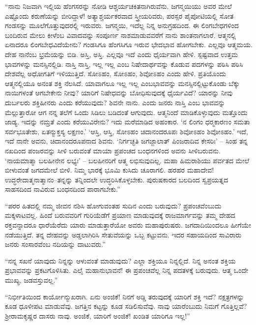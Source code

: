  “ನಾನು ನಿಜವಾಗಿ ಇಲ್ಲಿಯ ಹೆಂಗಸರನ್ನು ನೋಡಿ ಆಶ್ಚರ್ಯಚಕಿತನಾಗಿರುವೆನು. ಜಗನ್ಮಯಿಯು ಅವರ ಮೇಲೆ ಎಷ್ಟೊಂದು ಕರುಣೆಯನ್ನು ಬೀರಿದ್ದಾಳೆ! ಅತ್ಯಾಶ್ಚರ್ಯಕರವಾದ ಸ್ತ್ರೀಯರಿವರು, ಪರಸ್ಪರ ಪೈಪೋಟಿಯಲ್ಲಿ ಸೋತ ಗಂಡಸನ್ನು ಮೂಲೆಗೊತ್ತುವುದರಲ್ಲಿ ಇರುವರು. ಜಗನ್ಮಯಿ, ಇದೆಲ್ಲ ನಿನ್ನ ಅನುಗ್ರಹದಿಂದ. ಈ ಲಿಂಗಬೇಧಗಳಿಂದ ಬಂದಿರುವ ಮೇಲು ಕೀಳೆಂಬ ವಿವಾದವನ್ನು ಸಂಪೂರ್ಣ ನಾಶಮಾಡುವವರೆಗೆ ನಾನು ಶಾಂತನಾಗಲಾರೆ. ಆತ್ಮನಲ್ಲಿ ಏನಾದರೂ‌ ಲಿಂಗಬೇಧವಿದೆಯೇನು? ಗಂಡಸಿಗೂ ಹೆಂಗಸಿಗೂ ಇರುವ ಭೇದಭಾವ ಹೋಗಬೇಕು. ಎಲ್ಲವೂ ಆತ್ಮಮಯ. ದೇಹ ನಾನೆಂಬ ಭ್ರಮೆಯನ್ನು ಬಿಡಿ. ಅಸ್ತಿ, ಅಸ್ತಿ. ಎಲ್ಲವೂ ಇದೆ ಎಂದು ಧೈರ್ಯವಾಗಿ ಹೇಳಿ. ಸ್ಪಷ್ಟವಾದ ಉತ್ತಮ ಭಾವಗಳನ್ನು ಮನಸ್ಸಿನಲ್ಲಿಡಿ. ನಾಸ್ತಿ ನಾಸ್ತಿ, ಇಲ್ಲ ಇಲ್ಲ ಎಂಬ ನಿಷೇದಾರ್ಥವನ್ನು ಕೊಡುವ ಪದಗಳನ್ನು ಪಠಿಸಿ ಪಠಿಸಿ ದೇಶವೆಲ್ಲ ಅಧೋ\-ಗತಿಗೆ ಇಳಿಯುತ್ತಿದೆ. ಸೋಽಹಂ, ಸೋಽಹಂ, ಶಿವೋಽಹಂ ಎಂದು ಹೇಳಿ. ಪ್ರತಿಯೊಂದು ಆತ್ಮನಲ್ಲಿಯೂ ಅನಂತ ಶಕ್ತಿ ನೆಲಸಿದೆ. ಯಾವಾಗಲೂ ಇಲ್ಲ ಇಲ್ಲ ಎಂಬ\break ಭಾವವನ್ನು ಮನಸ್ಸಿನಲ್ಲಿಟ್ಟುಕೊಂಡು ಬೆಕ್ಕು ನಾಯಿಗಳಂತೆ ಆಗಬೇಕೇನು ನೀವು? ಯಾರಿಗೆ ನಿಷೇಧವನ್ನು ಬೋಧಿಸುವುದಕ್ಕೆ ಧೈರ್ಯವಿದೆ? ಯಾರನ್ನು ನೀವು ದುರ್ಬಲರು ಶಕ್ತಿಹೀನರು ಎಂದು ಕರೆಯುವುದು? ಶಿವನೇ ನಾನು. ಎಂದು ಜನರು ನಾಸ್ತಿ ಎಂಬ ಭಾವವನ್ನು ಮೆಲ್ಲುತ್ತಾರೋ ಆಗ ನನ್ನ ತಲೆಗೆ ಒಂದು ಸಿಡಿಲು ಬಡಿದಂತೆ ಆಗುವುದು. ಆತ್ಮನಿಂದೆ ಮಾಡಿಕೊಳ್ಳುವುದು ಮತ್ತೊಂದು ಜಾಡ್ಯ. ಇದನ್ನು ನಮ್ರತೆ ಎಂದು ಕರೆಯುವಿರೇನು? ಇದು ಮರೆಮಾಡಿದ ಅಹಂಕಾರ. ‘ನ ಲಿಂಗಂ ಧರ‍್ಮಕಾರಣಂ ಸಮತಾ ಸರ್ವಭೂತೇಶು, ಏತನ್ಮುಕ್ತಸ್ಯ ಲಕ್ಷಣಂ.’ ‘ಆಸ್ತಿ, ಆಸ್ತಿ, ಸೋಽಹಂ ಚಿದಾನಂದರೂಪಃ ಶಿವೋಽಹಂ ಶಿವೋಽಹಂ.’ ಇದೆ, ಇದೆ ನಾನೇ ಅವನು, ಚಿದಾನಂದರೂಪನಾದ ಶಿವನು. ‘ನಿರ್ಗಚ್ಛತಿ ಜಗಜ್ಜಾಲಾತ್ ಪಿಂಜರಾದಿವ ಕೇಸರಿಃ' – ಸಿಂಹ ತನ್ನ ನಖದಿಂದ ಪಂಜರವನ್ನು ಸೀಳಿ ಬರುವಂತೆ ಮಾಯಾ ಪ್ರಪಂಚದ ಬಂಧನಗಳಿಂದ ಅವನು ಸೀಳಿಬರುವನು. ‘ನಾಯಮಾತ್ಮಾ ಬಲಹೀನೇನ ಲಭ್ಯಃ’ – ಬಲಹೀನರಿಗೆ ಆತ್ಮ ಲಭಿಸುವುದಿಲ್ಲ. ಮಹಾ ಹಿಮರಾಶಿಯು ಪರ್ವತದ ಮೇಲೆ ಬೀಳುವಂತೆ ಜಗದಮೇಲೆ ಬೀಳಿ. ನಿಮ್ಮ ಭಾರಕ್ಕೆ ಭೂಮಿ ಕುಸಿದು ಚೂರಾಗಲಿ. ಹರಹರ ಮಹಾದೇವ! ಉದ್ಧರೇದಾತ್ಮನಾತ್ಮಾನಂ–ತನ್ನನ್ನು ತನ್ನಿಂದಲೇ ಉದ್ಧರಿಸಿಕೊಳ್ಳಬೇಕು. ಪುರುಷಕಾರದ ಬಲದಿಂದ ಸ್ವಪ್ರಯತ್ನದ ಸಾಹಸದಿಂದ ನಾವಿರುವ ಬಂಧನದಿಂದ ಪಾರಾಗಬೇಕು.” 

 “ಪರರ ಹಿತದಲ್ಲಿ ನಮ್ಮ ಜೀವನ ನಶಿಸಿ ಹೋಗುವಂತಹ ಸುದಿನ ಎಂದು ಬರುವುದು? ಪ್ರಪಂಚವೆಂಬುದು ಮಕ್ಕಳಾಟವಲ್ಲ. ಹಿಂದೆ ಬರುವವರಿಗೆ ಗುರಿಯೆಡೆಗೆ ಪ್ರಯಾಣ ಮಾಡುವುದಕ್ಕೆ ರಾಜಮಾರ್ಗವನ್ನು ತಮ್ಮ ದೇಹದ ರಕ್ತವನ್ನಾದರೂ ಧಾರೆಯೆರೆದು ಯಾರು ಮಾಡುತ್ತಾರೆಯೋ ಅವರು ಮಹಾಪುರುಷರು. ಜಗದಾದಿಯಿಂದಲೂ ಹೀಗೆಯೇ ನಡೆಯುತ್ತಿದೆ. ತನ್ನ ದೇಹವನ್ನು ಅಡ್ಡಲಾಗಿರಿಸಿ ಸೇತುವೆಯನ್ನು ಒಬ್ಬ ಕಟ್ಟುವನು. ಇದರ ಸಹಾಯದಿಂದ ಸಾವಿರಾರು ಜನರು ಸಂಸಾರವೆಂಬ ನದಿಯನ್ನು ದಾಟುವರು.” 

 “ನನ್ನ ಸಖನೆ ಯಾವುದು ನಿನ್ನನ್ನು ಆಳುವಂತೆ ಮಾಡುವುದು? ಎಲ್ಲಾ ಶಕ್ತಿಯೂ ನಿನ್ನಲ್ಲಿದೆ. ನಿನ್ನ ಅನಂತ ಶಕ್ತಿಯ ಪ್ರಭಾವವನ್ನು ಪ್ರಕಟಗೊಳಿಸಿತು. ಎಲೈ ಮಹಾನುಭಾವನೆ! ಈ ಪ್ರಪಂಚವೆಲ್ಲ ನಿನ್ನ ಪದತಳಕ್ಕೆ ಬರುವುದು. ಆತ್ಮ ಒಂದೇ ಮುಖ್ಯ, ಜಡವಸ್ತುವಲ್ಲ.” 

 “ನಿರ್ಭೀತಿಯಿಂದ ಕಾರ್ಯೋನ್ಮುಖರಾಗಿ. ಏನು ಅಂಜಿಕೆ! ನಿನಗೆ ಅಡ್ಡಿ ತರುವುದಕ್ಕೆ ಯಾರಿಗೆ ಶಕ್ತಿ ಇದೆ? ನಕ್ಷತ್ರಗಳನ್ನು ಕೂಡ ಧೂಳೀಪಟ ಮಾಡುವೆವು. ಜಗತ್ತಿನ ಕಟ್ಟನ್ನು ಕೂಡ ಸಡಿಲಿಸುವೆವು. ನಾವು ಯಾರೆಂಬುದು ನಿಮಗೆ ಗೊತ್ತಿಲ್ಲವೆ? ಶ‍್ರೀರಾಮಕೃಷ್ಣರ ದಾಸರು ನಾವು. ಅಂಜಿಕೆ, ಯಾರಿಗೆ ಅಂಜಿಕೆ! ಖಂಡಿತ ಯಾರಿಗೂ ಇಲ್ಲ!” 

